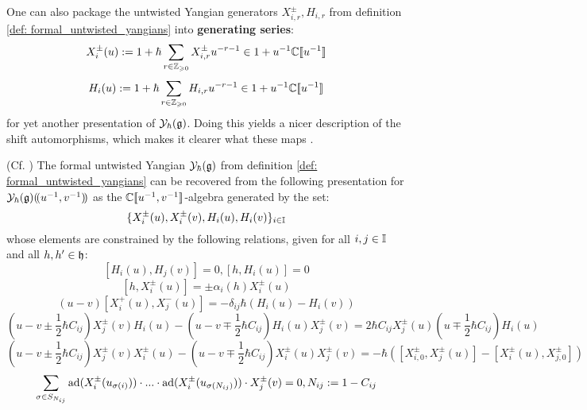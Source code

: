         One can also package the untwisted Yangian generators $X_{i, r}^{\pm}, H_{i, r}$ from definition \ref{def: formal_untwisted_yangians} into \textbf{generating  series}:
            $$X_i^{\pm}(u) := 1 + \hbar \sum_{r \in \mathbb{Z}_{\geqslant 0}} X_{i, r}^{\pm} u^{-r - 1} \in 1 + u^{-1} \mathbb{C}[\![u^{-1}]\!]$$
            $$H_i(u) := 1 + \hbar \sum_{r \in \mathbb{Z}_{\geqslant 0}} H_{i, r} u^{-r - 1} \in 1 + u^{-1} \mathbb{C}[\![u^{-1}]\!]$$
        for yet another presentation of $\mathcal{Y}_{\hbar}(\mathfrak{g})$. Doing this yields a nicer description of the shift automorphisms, which makes it clearer what these maps . 
        \begin{proposition} \label{prop: generating_series_for_finite_untwisted_yangians}
            (Cf. \cite[Proposition 2.3]{gautam_and_toledano_laredo_yangians_quantum_loop_algebras_and_abelian_difference_equations}) The formal untwisted Yangian $\mathcal{Y}_{\hbar}(\mathfrak{g})$ from definition \ref{def: formal_untwisted_yangians} can be recovered from the following presentation for $\mathcal{Y}_{\hbar}(\mathfrak{g})(\!(u^{-1}, v^{-1})\!)$ as the $\mathbb{C}[\![u^{-1}, v^{-1}]\!]$-algebra generated by the set:
                $$\{X_i^{\pm}(u), X_i^{\pm}(v), H_i(u), H_i(v)\}_{i \in \mathbb{I}}$$
            whose elements are constrained by the following relations, given for all $i, j \in \mathbb{I}$ and all $h, h' \in \mathfrak{h}$:
                $$[H_i(u), H_j(v)] = 0, [h, H_i(u)] = 0$$
                $$[h, X_i^{\pm}(u)] = \pm \alpha_i(h) X_i^{\pm}(u)$$
                $$(u - v) [X_i^+(u), X_j^-(u)] = -\delta_{ij} \hbar ( H_i(u) - H_i(v) )$$
                $$\left(u - v \pm \frac12 \hbar C_{ij}\right) X_j^{\pm}(v) H_i(u) - \left(u - v \mp  \frac12 \hbar C_{ij}\right) H_i(u) X_j^{\pm}(v) = 2 \hbar C_{ij} X_j^{\pm}(u) \left(u \mp \frac12 \hbar C_{ij}\right) H_i(u)$$
                $$\left(u - v \pm \frac12 \hbar C_{ij}\right) X_j^{\pm}(v) X_i^{\pm}(u) - \left(u - v \mp \frac12 \hbar C_{ij}\right) X_i^{\pm}(u) X_j^{\pm}(v) = -\hbar( [X_{i, 0}^{\pm}, X_j^{\pm}(u)] - [X_i^{\pm}(u), X_{j, 0}^{\pm}] )$$
                $$\sum_{\sigma \in S_{N_{ij}}} \mathrm{ad}( X_i^{\pm}( u_{\sigma(i)} ) ) \cdot ... \cdot \mathrm{ad}( X_i^{\pm}( u_{\sigma(N_{ij})} ) ) \cdot X_j^{\pm}(v) = 0, N_{ij} := 1 - C_{ij}$$
        \end{proposition}
